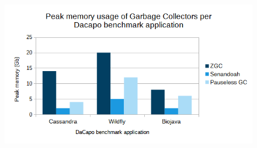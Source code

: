 \begin{graph2section}
    \begin{figure}[hbt!]
        \centering
        \includegraphics[width=1\columnwidth]{img/graph3.png}
    \end{figure}
\end{graph2section}



